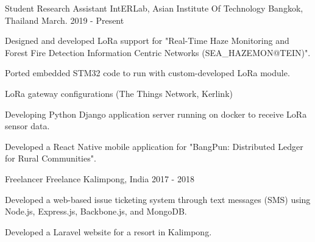

\begin{cventries}

  \cventry
    {Student Research Assistant} %
    {IntERLab, Asian Institute Of Technology} %
    {Bangkok, Thailand} %
    {March. 2019 - Present} %
    {\begin{cvitems} %
    \item {Designed and developed LoRa support for "Real-Time Haze Monitoring and Forest Fire Detection Information Centric Networks (SEA\_HAZEMON@TEIN)".}
    \item {Ported embedded STM32 code to run with custom-developed LoRa module.}
    \item {LoRa gateway configurations (The Things Network, Kerlink)}
    \item {Developing Python Django application server running on docker to receive LoRa sensor data.}
      \item {Developed a React Native mobile application for "BangPun: Distributed Ledger for Rural Communities".}
      \end{cvitems}}

  \cventry
    {Freelancer} %
    {Freelance} %
    {Kalimpong, India} %
    {2017 - 2018} %
    {\begin{cvitems} %
        \item {Developed a web-based issue ticketing system through text messages (SMS) using Node.js, Express.js, Backbone.js, and MongoDB.}
    \item {Developed a Laravel website for a resort in Kalimpong.}
      \end{cvitems}}


\end{cventries}
